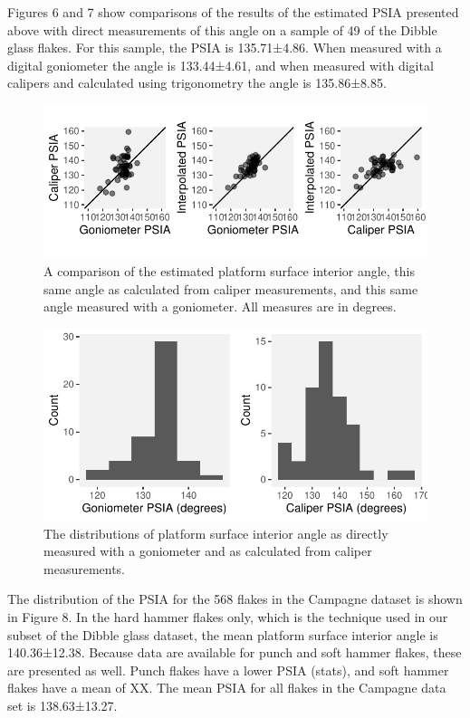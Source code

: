 \documentclass[10pt,letterpaper]{article}
\begin{document}
Figures 6 and 7 show comparisons of the results of the estimated PSIA
presented above with direct measurements of this angle on a sample of 49
of the Dibble glass flakes. For this sample, the PSIA is 135.71±4.86.
When measured with a digital goniometer the angle is 133.44±4.61, and
when measured with digital calipers and calculated using trigonometry
the angle is 135.86±8.85.

\begin{figure}
\centering
\includegraphics{PSIA_Manuscript_files/figure-latex/fig6_remeasure_comparisons-1.pdf}
\caption{A comparison of the estimated platform surface interior angle,
this same angle as calculated from caliper measurements, and this same
angle measured with a goniometer. All measures are in degrees.}
\end{figure}

\begin{figure}
\centering
\includegraphics{PSIA_Manuscript_files/figure-latex/fig7_remeasure_distributions-1.pdf}
\caption{The distributions of platform surface interior angle as
directly measured with a goniometer and as calculated from caliper
measurements.}
\end{figure}

The distribution of the PSIA for the 568 flakes in the Campagne dataset
is shown in Figure 8. In the hard hammer flakes only, which is the
technique used in our subset of the Dibble glass dataset, the mean
platform surface interior angle is 140.36±12.38. Because data are
available for punch and soft hammer flakes, these are presented as well.
Punch flakes have a lower PSIA (stats), and soft hammer flakes have a
mean of XX. The mean PSIA for all flakes in the Campagne data set is
138.63±13.27.
\end{document}
